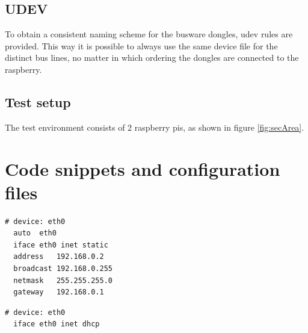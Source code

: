 \section{UDEV}

To obtain a consistent naming scheme for the busware dongles, udev rules are provided. This way it is possible to always use the same
device file for the distinct bus lines, no matter in which ordering the dongles are connected to the raspberry.

\section{Test setup}

The test environment consists of 2 raspberry pis, as shown in figure \ref{fig:secArea}. 

\chapter{Code snippets and configuration files}

\begin{lstlisting}[style=BashInputStyle,caption={Raspbian configuration for static ip address},label=lst:staticIP]
# device: eth0
  auto  eth0
  iface eth0 inet static
  address   192.168.0.2
  broadcast 192.168.0.255
  netmask   255.255.255.0
  gateway   192.168.0.1
\end{lstlisting}

\begin{lstlisting}[style=BashInputStyle,caption={Raspbian configuration for dynamic ip address},label=lst:dynamicIP]
# device: eth0
  iface eth0 inet dhcp
\end{lstlisting}


